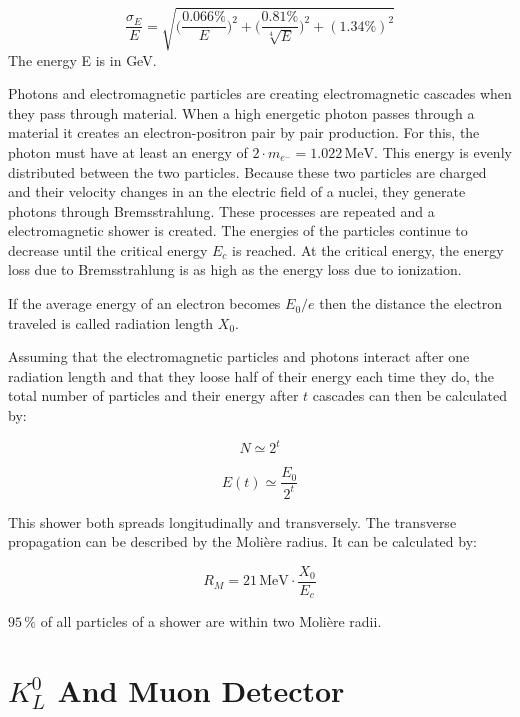 \documentclass[a4paper,11pt,twosided,final,german,openbib,pdftex,listof=totoc,bibliography=totoc]{scrbook}
\begin{document}
\begin{equation}
\frac{\sigma_E}{E} = \sqrt{\bigg(\frac{0.066\%}{E}\bigg)^2 + \bigg(\frac{0.81\%}{\sqrt[4]{E}}\bigg)^2 + (1.34\%)^2}
\end{equation}
The energy E is in GeV.
\newline

Photons and electromagnetic particles are creating electromagnetic cascades when they pass through material.\cite{leo2012techniques} When a high energetic photon passes through a material it creates an electron-positron pair by pair production. For this, the photon must have at least an energy of $2\cdot m_{e^{-}} = 1.022\,\textrm{MeV}$. This energy is evenly distributed between the two particles. Because these two particles are charged and their velocity changes in an the electric field of a nuclei, they generate photons through Bremsstrahlung. These processes are repeated and a electromagnetic shower is created. The energies of the particles continue to decrease until the critical energy $E_c$ is reached. At the critical energy, the energy loss due to Bremsstrahlung is as high as the energy loss due to ionization.

If the average energy of an electron becomes ${E_0}/{e}$ then the distance the electron traveled is called radiation length $X_0$.

Assuming that the electromagnetic particles and photons interact after one radiation length and that they loose half of their energy each time they do, the total number of particles and their energy after $t$ cascades can then be calculated by:\cite{leo2012techniques}

\begin{equation}
	N \simeq 2^t
\end{equation}

\begin{equation}
	E(t) \simeq \frac{E_0}{2^t}
\end{equation}

This shower both spreads longitudinally and transversely. The transverse propagation can be described by the Moli\`ere radius. It can be calculated by:

\begin{equation}
	R_M=21\,\textrm{MeV}\cdot \frac{X_0}{E_c}
\end{equation}

$ 95\,\%$ of all particles of a shower are within two Moli\`ere radii.\cite{leo2012techniques}

\section{$K_L^0$ And Muon Detector }
\label{sec:KM}
\end{document}

